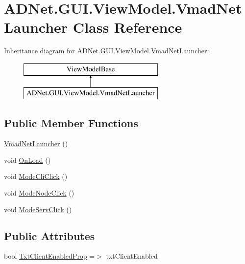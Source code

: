 \hypertarget{class_a_d_net_1_1_g_u_i_1_1_view_model_1_1_vmad_net_launcher}{}\section{A\+D\+Net.\+G\+U\+I.\+View\+Model.\+Vmad\+Net\+Launcher Class Reference}
\label{class_a_d_net_1_1_g_u_i_1_1_view_model_1_1_vmad_net_launcher}
Inheritance diagram for A\+D\+Net.\+G\+U\+I.\+View\+Model.\+Vmad\+Net\+Launcher\+:\begin{figure}[H]
\begin{center}
\leavevmode
\includegraphics[height=2.000000cm]{class_a_d_net_1_1_g_u_i_1_1_view_model_1_1_vmad_net_launcher}
\end{center}
\end{figure}
\subsection*{Public Member Functions}
\begin{DoxyCompactItemize}
\item 
\hyperlink{class_a_d_net_1_1_g_u_i_1_1_view_model_1_1_vmad_net_launcher_a284a16f14d571b282b2ea3e210421911}{Vmad\+Net\+Launcher} ()
\item 
void \hyperlink{class_a_d_net_1_1_g_u_i_1_1_view_model_1_1_vmad_net_launcher_ad6bf450a8713f395fc958ee87e8e1436}{On\+Load} ()
\item 
void \hyperlink{class_a_d_net_1_1_g_u_i_1_1_view_model_1_1_vmad_net_launcher_a5681607b14ba4d607e1be4aca8a45828}{Mode\+Cli\+Click} ()
\item 
void \hyperlink{class_a_d_net_1_1_g_u_i_1_1_view_model_1_1_vmad_net_launcher_a6b4f4c95217b50fb8a41edd483cb1136}{Mode\+Node\+Click} ()
\item 
void \hyperlink{class_a_d_net_1_1_g_u_i_1_1_view_model_1_1_vmad_net_launcher_a143db57ad7fb87a64188b61ff09a7eaf}{Mode\+Serv\+Click} ()
\end{DoxyCompactItemize}
\subsection*{Public Attributes}
\begin{DoxyCompactItemize}
\item 
bool \hyperlink{class_a_d_net_1_1_g_u_i_1_1_view_model_1_1_vmad_net_launcher_a65e41fc89e38248db8cdf9854e4202e7}{Txt\+Client\+Enabled\+Prop} =$>$ txt\+Client\+Enabled
\end{DoxyCompactItemize}
